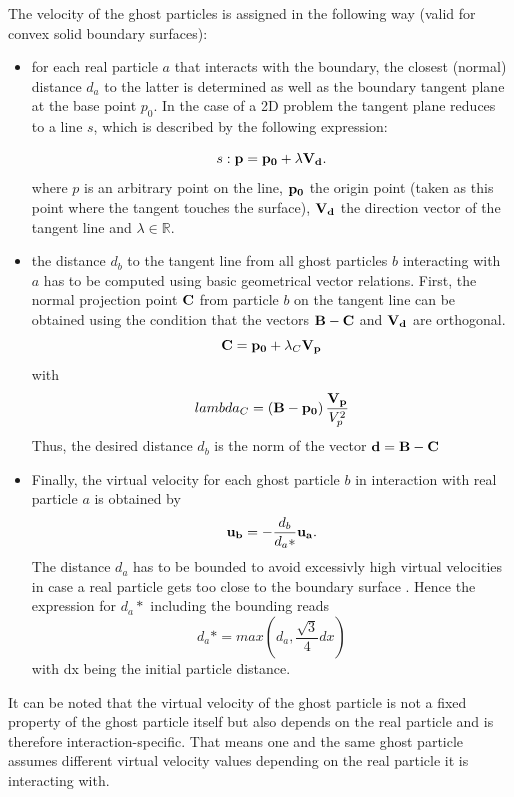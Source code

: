 \documentclass{report}
\begin{document}
\begin{itemize}
The velocity of the ghost particles is assigned in the following way \cite{Zhu1999} (valid for convex solid boundary surfaces): 
\begin{itemize}
\item for each real particle $a$ that interacts with the boundary, the closest (normal) distance $d_a$ to the latter is determined as well as the boundary tangent plane at the base point $p_0$. In the case of a 2D problem the tangent plane reduces to a line $s$, which is described by the following expression:

\begin{equation}
 \label{eq:BoundaryTangentEquation}
s: {\bf p}={\bf p_0}+\lambda {\bf V_d}.
\end{equation}
where $p$ is an arbitrary point on the line, ${\bf p_0}$ the origin point (taken as this point where the tangent touches the surface), ${\bf V_d}$ the direction vector of the tangent line and $\lambda \in \mathbb{R}$.
\item the distance $d_b$ to the tangent line from all ghost particles $b$ interacting with $a$ has to be computed using basic geometrical vector relations. First, the normal projection point ${\bf C}$ from particle $b$ on the tangent line can be obtained using the condition that the vectors ${\bf B}-{\bf C}$ and ${\bf V_d}$ are orthogonal.
\begin{equation}
 {\bf C}={\bf p_0}+\lambda_C {\bf V_p}
\end{equation}
with 
\begin{equation}
 lambda_C=\left({\bf B}-{\bf p_0}\right)\frac{{\bf V_p}}{V_p^2}
\end{equation}
Thus, the desired distance $d_b$ is the norm of the vector ${\bf d}={\bf B}-{\bf C}$
\item Finally, the virtual velocity for each ghost particle $b$ in interaction with real particle $a$ is obtained by
\begin{equation}
 {\bf u_b}=-\frac{d_b}{d_a*} {\bf u_a}.
\end{equation}
The distance $d_a$ has to be bounded to avoid excessivly high virtual velocities in case a real particle gets too close to the boundary surface \cite{Zhu1999}. Hence the expression for $d_a*$ including the bounding reads
\begin{equation}
 d_a*=\mathit{max}\left(d_a,\frac{\sqrt{3}}{4}dx\right)
\end{equation}
with dx being the initial particle distance.


\end{itemize}
It can be noted that the virtual velocity of the ghost particle is not a fixed property of the ghost particle itself but also depends on the real particle and is therefore interaction-specific. That means one and the same ghost particle assumes different virtual velocity values depending on the real particle it is interacting with.

\end{itemize}
\end{document}
